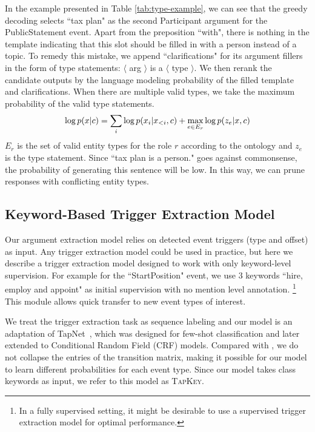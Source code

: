 In the example presented in Table \ref{tab:type-example}, we can see that the greedy decoding selects ``tax plan" as the second Participant argument for the PublicStatement event.
Apart from the preposition ``with", there is nothing in the template indicating that this slot should be filled in with a person instead of a topic. 
To remedy this mistake, we append ``clarifications" for its argument fillers in the form of type statements: $\langle$ arg $\rangle$ is a $\langle$ type $\rangle$. 
We then rerank the candidate outputs by the language modeling probability of the filled template and clarifications. When there are multiple valid types, we take the maximum probability of the valid type statements.
\begin{equation}
\small 
    \log p(x| c) = \sum_i \log p(x_i | x_{<i}, c) + \max_{e \in E_r} \log p(z_e | x, c ) 
\end{equation}
$E_r$ is the set of valid entity types for the role $r$ according to the ontology and $z_e$ is the type statement. 
Since ``tax plan is a person." goes against commonsense, the probability of generating this sentence will be low.  
In this way, we can prune responses with conflicting entity types. 

\subsection{Keyword-Based Trigger Extraction Model}
Our argument extraction model relies on detected event triggers (type and offset) as input. Any trigger extraction model could be used in practice, but here we describe a trigger extraction model designed to work with only keyword-level supervision. For example for the ``StartPosition" event, we use 3 keywords ``hire, employ and appoint" as initial supervision with no mention level annotation. \footnote{In a fully supervised setting, it might be desirable to use a supervised trigger extraction model for optimal performance.} This module allows quick transfer to new event types of interest. 

We treat the trigger extraction task as sequence labeling and 
our model is an adaptation of TapNet~\cite{Yoon2019TapNetNN, Hou2020FewshotST}, which was designed for few-shot classification and later extended to Conditional Random Field (CRF) models. Compared with \cite{Hou2020FewshotST}, we do not collapse the entries of the transition matrix, making it possible for our model to learn different probabilities for each event type.
Since our model takes class keywords as input, we refer to this model as \textsc{TapKey}. %

